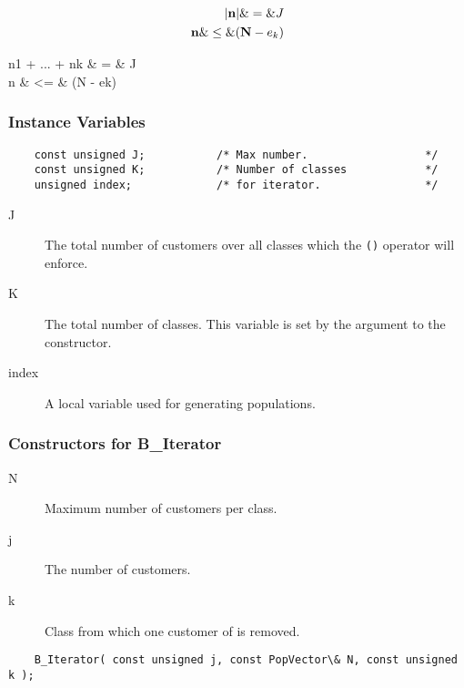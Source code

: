 \begin{iftex}
  \tex
  \begin{eqnarray*}
    |{\bf n}| \& = \& J \\
    {\bf n} \& \leq \& ({\bf N} - e_k)
  \end{eqnarray*}
\end{iftex}
\begin{ifhtml}
  \begin{tabular}
    n1 + ... + nk \& = \& J \\
    n \& <= \& (N - ek)
  \end{tabular}
\end{ifhtml}

\subsubsection{Instance Variables}
\label{sec:pop-BIter-ivars}
\begin{verbatim}
    const unsigned J;           /* Max number.                  */
    const unsigned K;           /* Number of classes            */
    unsigned index;             /* for iterator.                */
\end{verbatim}

\begin{description}
\item[J] \texonly{---} The total number of customers over all classes
  which the \texttt{()} operator will enforce.
\item[K] \texonly{---} The total number of classes.  This variable is
  set by the argument  to the constructor.
\item[index] \texonly{---} A local variable used for generating
  populations. 
\end{description}

\subsubsection{Constructors for B\_Iterator}

\begin{description}
\item[N] \texonly{---} Maximum number of customers per class.
\item[j] \texonly{---} The number of customers.
\item[k] \texonly{---} Class from which one customer of  is removed.
\end{description}

\begin{verbatim}
    B_Iterator( const unsigned j, const PopVector\& N, const unsigned k );
\end{verbatim}

